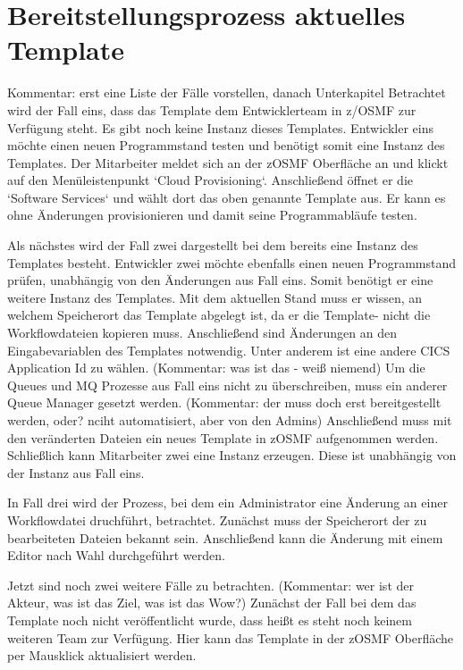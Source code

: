 \section{Bereitstellungsprozess aktuelles Template}\label{sec:akttemp}

Kommentar: erst eine Liste der Fälle vorstellen, danach Unterkapitel
Betrachtet wird der Fall eins, dass das Template dem Entwicklerteam in z/OSMF zur Verfügung steht.
Es gibt noch keine Instanz dieses Templates.
Entwickler eins möchte einen neuen Programmstand testen und benötigt somit eine Instanz des Templates.
Der Mitarbeiter meldet sich an der zOSMF Oberfläche an und klickt auf den Menüleistenpunkt `Cloud Provisioning`.
Anschließend öffnet er die `Software Services` und wählt dort das oben genannte Template aus.
Er kann es ohne Änderungen provisionieren und damit seine Programmabläufe testen.

Als nächstes wird der Fall zwei dargestellt bei dem bereits eine Instanz des Templates besteht.
Entwickler zwei möchte ebenfalls einen neuen Programmstand prüfen, unabhängig von den Änderungen aus Fall eins.
Somit benötigt er eine weitere Instanz des Templates.
Mit dem aktuellen Stand muss er wissen, an welchem Speicherort das Template abgelegt ist, da er die Template- nicht die Workflowdateien kopieren muss.
Anschließend sind Änderungen an den Eingabevariablen des Templates notwendig.
Unter anderem ist eine andere CICS Application Id zu wählen. (Kommentar: was ist das - weiß niemend)
Um die Queues und MQ Prozesse aus Fall eins nicht zu überschreiben, muss  ein anderer Queue Manager gesetzt werden. (Kommentar: der muss doch erst bereitgestellt werden, oder? nciht automatisiert, aber von den Admins)
Anschließend muss mit den veränderten Dateien ein neues Template in zOSMF aufgenommen werden.
Schließlich kann Mitarbeiter zwei eine Instanz erzeugen.
Diese ist unabhängig von der Instanz aus Fall eins.

In Fall drei wird der Prozess, bei dem ein Administrator eine Änderung an einer Workflowdatei druchführt, betrachtet.
Zunächst muss der Speicherort der zu bearbeiteten Dateien bekannt sein.
Anschließend kann die Änderung mit einem Editor nach Wahl durchgeführt werden.

Jetzt sind noch zwei weitere Fälle zu betrachten. (Kommentar: wer ist der Akteur, was ist das Ziel, was ist das Wow?)
Zunächst der Fall bei dem das Template noch nicht veröffentlicht wurde, dass heißt es steht noch keinem weiteren Team zur Verfügung.
Hier kann das Template in der zOSMF Oberfläche per Mausklick aktualisiert werden.

